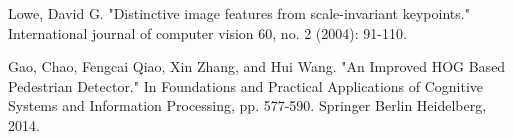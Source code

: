 \documentclass[12pt,a4paper]{article}
\theoremstyle{definition}
\theoremstyle{theorem}
\theoremstyle{definition}
\begin{document}
\newpage






\small


\begin{thebibliography}{99}

\begin{LTRitems}

\resetlatinfont

Lowe, David G. "Distinctive image features from scale-invariant keypoints." International journal of computer vision 60, no. 2 (2004): 91-110.

Gao, Chao, Fengcai Qiao, Xin Zhang, and Hui Wang. "An Improved HOG Based Pedestrian Detector." In Foundations and Practical Applications of Cognitive Systems and Information Processing, pp. 577-590. Springer Berlin Heidelberg, 2014.

\end{LTRitems}

\end{thebibliography}
\end{document}
